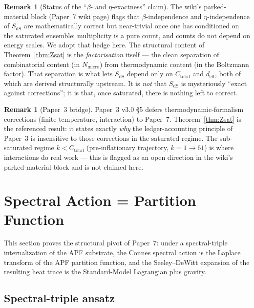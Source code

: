 \documentclass[11pt,a4paper]{article}
\theoremstyle{definition}
\newtheorem{remark}[theorem]{Remark}
\newcommand{\Ctot}{C_{\mathrm{total}}}
\newcommand{\deff}{d_{\mathrm{eff}}}
\begin{document}
\begin{remark}[Status of the ``$\beta$- and $\eta$-exactness'' claim]
\label{rem:triviality}
The wiki's parked-material block (Paper~7 wiki page) flags that $\beta$-independence and $\eta$-independence of $S_{\mathrm{dS}}$ are mathematically correct but near-trivial once one has conditioned on the saturated ensemble: multiplicity is a pure count, and counts do not depend on energy scales.  We adopt that hedge here.  The structural content of Theorem~\ref{thm:Zsat} is the \emph{factorisation} itself --- the clean separation of combinatorial content (in $N_{\mathrm{micro}}$) from thermodynamic content (in the Boltzmann factor).  That separation is what lets $S_{\mathrm{dS}}$ depend only on $\Ctot$ and $\deff$, both of which are derived structurally upstream.  It is \emph{not} that $S_{\mathrm{dS}}$ is mysteriously ``exact against corrections''; it is that, once saturated, there is nothing left to correct.
\end{remark}

\begin{remark}[Paper~3 bridge]
Paper~3 v3.0 §5 defers thermodynamic-formalism corrections (finite-temperature, interaction) to Paper~7.  Theorem~\ref{thm:Zsat} is the referenced result: it states exactly \emph{why} the ledger-accounting principle of Paper~3 is insensitive to those corrections in the saturated regime.  The sub-saturated regime $k<\Ctot$ (pre-inflationary trajectory, $k=1\to 61$) is where interactions do real work --- this is flagged as an open direction in the wiki's parked-material block and is not claimed here.
\end{remark}

\section{Spectral Action = Partition Function}\label{sec:SAeqZ}
\setcounter{theorem}{0}

This section proves the structural pivot of Paper~7: under a spectral-triple internalization of the APF substrate, the Connes spectral action is the Laplace transform of the APF partition function, and the Seeley--DeWitt expansion of the resulting heat trace is the Standard-Model Lagrangian plus gravity.

\subsection{Spectral-triple ansatz}
\end{document}
